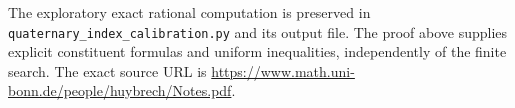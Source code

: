 The exploratory exact rational computation is preserved in
\nolinkurl{quaternary_index_calibration.py} and its output file.
The proof above supplies explicit constituent formulas and
uniform inequalities, independently of the finite search.
The exact source URL is
\url{https://www.math.uni-bonn.de/people/huybrech/Notes.pdf}.
